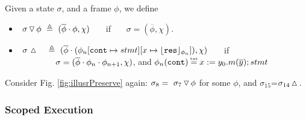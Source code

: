  
 
 
 
\begin{definition}
\label{def:push:frame}
Given a state $\sigma$, and a frame $\phi$,  we define
\begin{itemize}
\item
 $  \ {\sigma} \, {\triangledown}\, {\phi}  \ \triangleq \ ({\overline{\phi}\cdot\phi}, \chi)$ \ \ \  if \ \ \  $\sigma=(\overline{\phi}, \chi)$.
\item
$ \ \sigma\, \popSymbol \ \ \  \triangleq\   { (\overline{\phi}\cdot (\phi_n[\prg{cont}\mapsto stmt][x \mapsto \interpret {\phi_n}{\prg{res}}]), \chi)}$ \ \ \  if \\
 $\strut \hspace{1.5cm} \sigma=(\overline{\phi}\cdot\phi_n\cdot\phi_{n+1}, \chi)$, and $\phi_n(\prg{cont})\txteq x:= y_0.m(\overline y); stmt $
\end{itemize}
 \end{definition}

 \noindent Consider Fig. \ref{fig:illusrPreserve}  again: $\sigma_8 =  \ {\sigma_7} \, {\triangledown}\, {\phi} $ for some $\phi$, {and}  $\sigma_{15}$=$\sigma_{14} \, {\vartriangle}\,$.

 
 \subsubsection{Scoped Execution}
 \label{sect:bounded}


